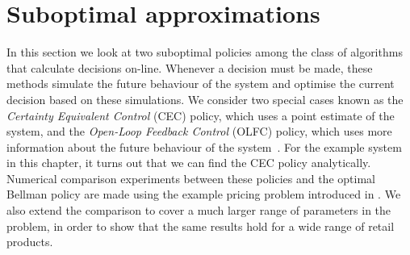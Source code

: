 \documentclass[main.tex]{subfiles}
\begin{document}
\section{Suboptimal
  approximations}\label{sec:suboptimal_approximations}
In this section we look at two suboptimal policies among the class of
algorithms that calculate decisions on-line.
Whenever a decision must be made, these methods simulate the future
behaviour of the system and optimise the current decision based on
these simulations.
We consider two special cases known as the
\emph{Certainty Equivalent Control} (CEC) policy, which uses a point
estimate of the system, and
the \emph{Open-Loop Feedback Control} (OLFC) policy, which uses more
information about the  future behaviour of the system~\citep[Ch.~6]{bertsekas2005dynamic}.
For the example system in this chapter, it turns out that we can find
the CEC policy analytically.
Numerical comparison experiments between these policies and the optimal
Bellman policy are
made using the example pricing problem introduced in
. We also extend the comparison to
cover a much larger range of parameters in the problem, in order to show that
the same results hold for a wide range of retail products.
\end{document}
